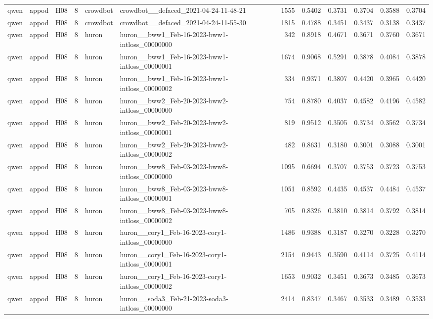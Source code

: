 \begin{table}[tbp]
\begin{tabular}{lllrllrrrrrr}
qwen & appod & H08 & 8 & crowdbot & crowdbot\_\_defaced\_2021-04-24-11-48-21 & 1555 & 0.5402 & 0.3731 & 0.3704 & 0.3588 & 0.3704 \\
qwen & appod & H08 & 8 & crowdbot & crowdbot\_\_defaced\_2021-04-24-11-55-30 & 1815 & 0.4788 & 0.3451 & 0.3437 & 0.3138 & 0.3437 \\
qwen & appod & H08 & 8 & huron & huron\_\_bww1\_Feb-16-2023-bww1-intloss\_00000000 & 342 & 0.8918 & 0.4671 & 0.3671 & 0.3760 & 0.3671 \\
qwen & appod & H08 & 8 & huron & huron\_\_bww1\_Feb-16-2023-bww1-intloss\_00000001 & 1674 & 0.9068 & 0.5291 & 0.3878 & 0.4084 & 0.3878 \\
qwen & appod & H08 & 8 & huron & huron\_\_bww1\_Feb-16-2023-bww1-intloss\_00000002 & 334 & 0.9371 & 0.3807 & 0.4420 & 0.3965 & 0.4420 \\
qwen & appod & H08 & 8 & huron & huron\_\_bww2\_Feb-20-2023-bww2-intloss\_00000000 & 754 & 0.8780 & 0.4037 & 0.4582 & 0.4196 & 0.4582 \\
qwen & appod & H08 & 8 & huron & huron\_\_bww2\_Feb-20-2023-bww2-intloss\_00000001 & 819 & 0.9512 & 0.3505 & 0.3734 & 0.3562 & 0.3734 \\
qwen & appod & H08 & 8 & huron & huron\_\_bww2\_Feb-20-2023-bww2-intloss\_00000002 & 482 & 0.8631 & 0.3180 & 0.3001 & 0.3088 & 0.3001 \\
qwen & appod & H08 & 8 & huron & huron\_\_bww8\_Feb-03-2023-bww8-intloss\_00000000 & 1095 & 0.6694 & 0.3707 & 0.3753 & 0.3723 & 0.3753 \\
qwen & appod & H08 & 8 & huron & huron\_\_bww8\_Feb-03-2023-bww8-intloss\_00000001 & 1051 & 0.8592 & 0.4435 & 0.4537 & 0.4484 & 0.4537 \\
qwen & appod & H08 & 8 & huron & huron\_\_bww8\_Feb-03-2023-bww8-intloss\_00000002 & 705 & 0.8326 & 0.3810 & 0.3814 & 0.3792 & 0.3814 \\
qwen & appod & H08 & 8 & huron & huron\_\_cory1\_Feb-16-2023-cory1-intloss\_00000000 & 1486 & 0.9388 & 0.3187 & 0.3270 & 0.3228 & 0.3270 \\
qwen & appod & H08 & 8 & huron & huron\_\_cory1\_Feb-16-2023-cory1-intloss\_00000001 & 2154 & 0.9443 & 0.3590 & 0.4114 & 0.3725 & 0.4114 \\
qwen & appod & H08 & 8 & huron & huron\_\_cory1\_Feb-16-2023-cory1-intloss\_00000002 & 1653 & 0.9032 & 0.3451 & 0.3673 & 0.3485 & 0.3673 \\
qwen & appod & H08 & 8 & huron & huron\_\_soda3\_Feb-21-2023-soda3-intloss\_00000000 & 2414 & 0.8347 & 0.3467 & 0.3533 & 0.3489 & 0.3533 \\

\end{tabular}
\end{table}
